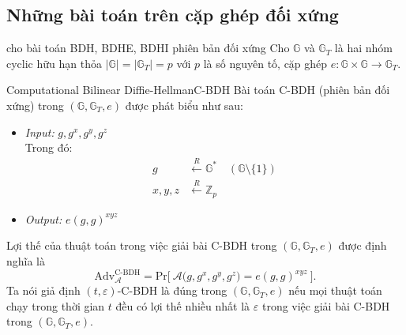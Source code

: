 \documentclass[class=report, crop=false]{standalone}
\begin{document}
		\subsection{Những bài toán trên cặp ghép đối xứng}
			\begin{supposition}{cho bài toán BDH, BDHE, BDHI phiên bản đối xứng}
				Cho $\mathbb{G}$ và $\mathbb{G}_T$ là hai nhóm cyclic hữu hạn thỏa $|\mathbb{G}| = |\mathbb{G}_T| = p$ với $p$ là số nguyên tố, cặp ghép $e: \mathbb{G} \times \mathbb{G} \rightarrow \mathbb{G}_T$.
			\end{supposition}
			\begin{problem}{Computational Bilinear Diffie-Hellman}{C-BDH}
				Bài toán C-BDH (phiên bản đối xứng) trong $(\mathbb{G}, \mathbb{G}_T, e)$ được phát biểu như sau:
				\vspace{-\baselineskip}
				\begin{itemize}[leftmargin=1.5cm, itemindent=-0.5cm]
					\item[] \textit{Input:} $g, g^x, g^y, g^z$ \\
					Trong đó: \vspace{-\baselineskip}
					\begin{align*}
						g 			&\xleftarrow{R} \mathbb{G}^* \quad (\mathbb{G} \setminus \{1\}) \\
						x, y, z 	&\xleftarrow{R} \mathbb{Z}_p
					\end{align*}
					\item[] \textit{Output:} $e(g, g)^{xyz}$
				\end{itemize}
				\vspace{-\baselineskip}\par
				Lợi thế của thuật toán \algo trong việc giải bài C-BDH trong $(\mathbb{G}, \mathbb{G}_T, e)$ được định nghĩa là
				\[
					\text{Adv}_{\mathcal{A}}^{\text{C-BDH}} = \text{Pr}\bigg[ \ \mathcal{A}\Big(g, g^x, g^y, g^z \Big) = e(g, g)^{xyz} \ \bigg].
				\] \indent
				Ta nói giả định $(t, \varepsilon)$-C-BDH là đúng trong $(\mathbb{G}, \mathbb{G}_T, e)$ nếu mọi thuật toán chạy trong thời gian $t$ đều có lợi thế nhiều nhất là $\varepsilon$ trong việc giải bài C-BDH trong $(\mathbb{G}, \mathbb{G}_T, e)$.
			\end{problem}
			\newpage
\end{document}
